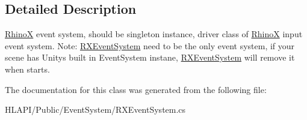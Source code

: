 \subsection{Detailed Description}
\mbox{\hyperlink{namespace_ximmerse_1_1_rhino_x}{RhinoX}} event system, should be singleton instance, driver class of \mbox{\hyperlink{namespace_ximmerse_1_1_rhino_x}{RhinoX}} input event system. Note\+: \mbox{\hyperlink{class_ximmerse_1_1_rhino_x_1_1_r_x_event_system}{R\+X\+Event\+System}} need to be the only event system, if your scene has Unity\textquotesingle{}s built in Event\+System instane, \mbox{\hyperlink{class_ximmerse_1_1_rhino_x_1_1_r_x_event_system}{R\+X\+Event\+System}} will remove it when starts. 



The documentation for this class was generated from the following file\+:\begin{DoxyCompactItemize}
\item 
H\+L\+A\+P\+I/\+Public/\+Event\+System/R\+X\+Event\+System.\+cs\end{DoxyCompactItemize}
